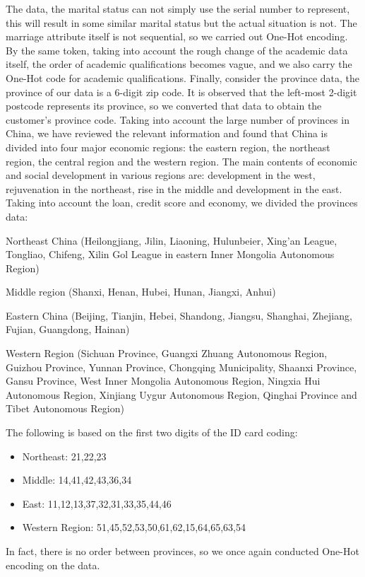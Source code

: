 \documentclass{mcmthesis}
\begin{document}
The data, the marital status can not simply use the serial number to represent, this will result in some similar marital status but the actual situation is not. The marriage attribute itself is not sequential, so we carried out One-Hot encoding. By the same token, taking into account the rough change of the academic data itself, the order of academic qualifications becomes vague, and we also carry the One-Hot code for academic qualifications. Finally, consider the province data, the province of our data is a 6-digit zip code. It is observed that the left-most 2-digit postcode represents its province, so we converted that data to obtain the customer's province code. Taking into account the large number of provinces in China, we have reviewed the relevant information and found that China is divided into four major economic regions: the eastern region, the northeast region, the central region and the western region. The main contents of economic and social development in various regions are: development in the west, rejuvenation in the northeast, rise in the middle and development in the east. Taking into account the loan, credit score and economy, we divided the provinces data:

Northeast China (Heilongjiang, Jilin, Liaoning, Hulunbeier, Xing'an League, Tongliao, Chifeng, Xilin Gol League in eastern Inner Mongolia Autonomous Region)

Middle region (Shanxi, Henan, Hubei, Hunan, Jiangxi, Anhui)

Eastern China (Beijing, Tianjin, Hebei, Shandong, Jiangsu, Shanghai, Zhejiang, Fujian, Guangdong, Hainan)

Western Region (Sichuan Province, Guangxi Zhuang Autonomous Region, Guizhou Province, Yunnan Province, Chongqing Municipality, Shaanxi Province, Gansu Province, West Inner Mongolia Autonomous Region, Ningxia Hui Autonomous Region, Xinjiang Uygur Autonomous Region, Qinghai Province and Tibet Autonomous Region)

The following is based on the first two digits of the ID card coding:
\begin{itemize}
  \item Northeast: 21,22,23
  \item Middle: 14,41,42,43,36,34
  \item East: 11,12,13,37,32,31,33,35,44,46  
  \item Western Region: 51,45,52,53,50,61,62,15,64,65,63,54
\end{itemize}

In fact, there is no order between provinces, so we once again conducted One-Hot encoding on the data.
\end{document}
